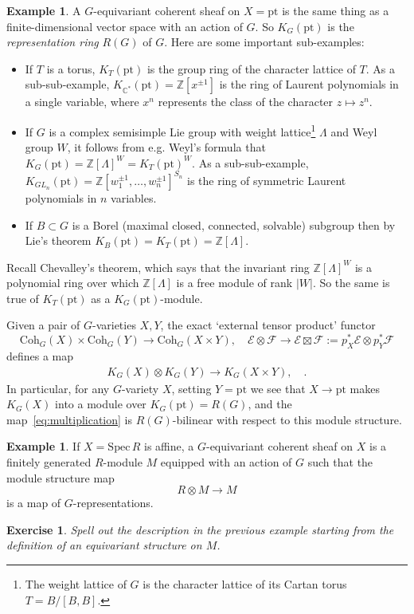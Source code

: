 \documentclass[11pt]{amsart}
\newtheorem{exercise}[dummy]{Exercise}
\theoremstyle{definition}
\newtheorem{example}[dummy]{Example}
\newcommand{\bZ}{\mathbb{Z}}
\newcommand{\Ec}{\mathcal{E}}
\newcommand{\Fc}{\mathcal{F}}
\newcommand{\Spec}{\mathrm{Spec}\,}
\newcommand{\Coh}{\mathrm{Coh}}
\numberwithin{equation}{subsection}
\numberwithin{figure}{subsection}
\newcommand{\pt}{\mathrm{pt}}
\begin{document}
\begin{example}
\label{eg:kpoint}
A $G$-equivariant coherent sheaf on $X=\pt$ is the same thing as a finite-dimensional vector space with an action of $G$. So $K_G(\pt)$ is the \emph{representation ring} $R(G)$ of $G$. Here are some important sub-examples: 
\begin{itemize}
\item If $T$ is a torus, $K_T(\pt)$ is the group ring of the character lattice of $T$. As a sub-sub-example, $K_{\mathbb{C}^*}(\pt)=\mathbb{Z}[x^{\pm1}]$ is the ring of Laurent polynomials in a single variable, where $x^n$ represents the class of the character $z\mapsto z^n$.

\item If $G$ is a complex semisimple Lie group with weight lattice\footnote{The weight lattice of $G$ is the character lattice of its Cartan torus $T=B/[B,B]$.} $\Lambda$  and Weyl group $W$, it follows from e.g. Weyl's formula that $K_G(\pt)=\mathbb{Z}[\Lambda]^W=K_T(\pt)^W$. As a sub-sub-example, $K_{GL_n}(\pt)=\bZ[w_1^{\pm1},\ldots,w_n^{\pm1}]^{S_n}$ is the ring of symmetric Laurent polynomials in $n$ variables.
\item If $B\subset G$ is a Borel (maximal closed, connected, solvable) subgroup then by Lie's theorem $K_B(\pt)=K_T(\pt)=\bZ[\Lambda]$.
\end{itemize}
Recall Chevalley's theorem, which says that the invariant ring $\bZ[\Lambda]^W$ is a polynomial ring over which $\bZ[\Lambda]$ is a free module of rank $|W|$. So the same is true of $K_T(\pt)$ as a $K_G(\pt)$-module.
\end{example}

Given a pair of $G$-varieties $X,Y$, the exact `external tensor product' functor 
$$
\Coh_G(X)\times \Coh_G(Y)\rightarrow \Coh_G(X\times Y),\quad \Ec\otimes\Fc \rightarrow \Ec\boxtimes\Fc:=p_X^*\Ec\otimes p_Y^*\Fc
$$ defines a map
\begin{align}
\label{eq:multiplication}
K_G(X)\otimes K_G(Y)\rightarrow K_G(X\times Y),\quad .
\end{align}
In particular, for any $G$-variety $X$, setting $Y=\pt$ we see that $X\rightarrow \pt$ makes $K_G(X)$ into a module over $K_G(\pt)= R(G)$,  and the map~\eqref{eq:multiplication} is $R(G)$-bilinear with respect to this module structure.

\begin{example}
If $X=\Spec R$ is affine, a $G$-equivariant coherent sheaf on $X$ is a finitely generated $R$-module $M$ equipped with an action of $G$ such that the module structure map
$$
R\otimes M \rightarrow M
$$
is a map of $G$-representations.
\end{example}
\begin{exercise}
Spell out the description in the previous example starting from the definition of an equivariant structure on $M$.
\end{exercise}
\end{document}

